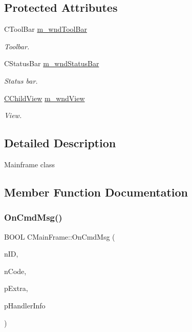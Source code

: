 \subsection*{Protected Attributes}
\begin{DoxyCompactItemize}
\item 
\mbox{\label{class_c_main_frame_a73024d794dce2fe918f6b117371c25fc}} 
C\+Tool\+Bar \mbox{\hyperlink{class_c_main_frame_a73024d794dce2fe918f6b117371c25fc}{m\+\_\+wnd\+Tool\+Bar}}
\begin{DoxyCompactList}\small\item\em Toolbar. \end{DoxyCompactList}\item 
\mbox{\label{class_c_main_frame_ac01bafc03aee69cf982e6f029b4db6b0}} 
C\+Status\+Bar \mbox{\hyperlink{class_c_main_frame_ac01bafc03aee69cf982e6f029b4db6b0}{m\+\_\+wnd\+Status\+Bar}}
\begin{DoxyCompactList}\small\item\em Status bar. \end{DoxyCompactList}\item 
\mbox{\label{class_c_main_frame_a7c3af9327c496f8c807d578f7a4ef4c5}} 
\mbox{\hyperlink{class_c_child_view}{C\+Child\+View}} \mbox{\hyperlink{class_c_main_frame_a7c3af9327c496f8c807d578f7a4ef4c5}{m\+\_\+wnd\+View}}
\begin{DoxyCompactList}\small\item\em View. \end{DoxyCompactList}\end{DoxyCompactItemize}


\subsection{Detailed Description}
Mainframe class 

\subsection{Member Function Documentation}
\mbox{\label{class_c_main_frame_ade959eb0bab719bf06bb9b18ee407101}} 
\subsubsection{\texorpdfstring{OnCmdMsg()}{OnCmdMsg()}}
{\footnotesize\ttfamily B\+O\+OL C\+Main\+Frame\+::\+On\+Cmd\+Msg (\begin{DoxyParamCaption}\item[{U\+I\+NT}]{n\+ID,  }\item[{int}]{n\+Code,  }\item[{void $\ast$}]{p\+Extra,  }\item[{A\+F\+X\+\_\+\+C\+M\+D\+H\+A\+N\+D\+L\+E\+R\+I\+N\+FO $\ast$}]{p\+Handler\+Info }\end{DoxyParamCaption})\hspace{0.3cm}{\ttfamily [virtual]}}

